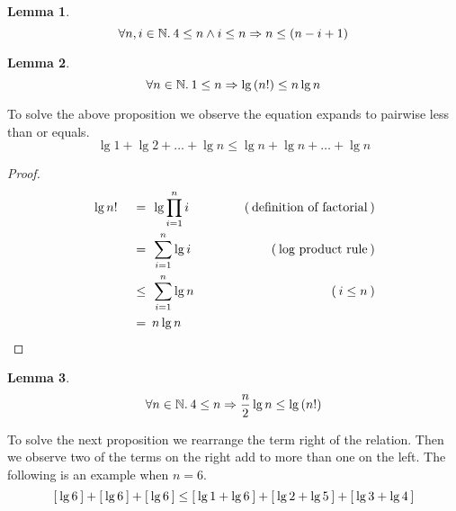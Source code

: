 \documentclass{article}
\newtheorem{lemma}{Lemma}
\theoremstyle{definition}
\newcommand{\evidence}[1]{\ensuremath{\hspace{3em} (\hspace{0.2em} \text{#1} \hspace{0.2em})}}
\newcommand{\relation}[1]{\ensuremath{\hspace{0.2em} {{} #1 {}} \hspace{0.2em}}}
\newcommand{\equal}{\relation{=}}
\newcommand{\lesseq}{\relation{\le}}
\newcommand{\parens}[1]{\left(#1\right)}
\newcommand{\brackets}[1]{\ensuremath{[ \hspace{0.2em} #1 \hspace{0.2em} ]}}
\newcommand{\quantify}[2]{\ensuremath{\forall #1 \in \mathbb{#2}. \hspace{0.2em}}}
\begin{document}
\begin{lemma}
  \begin{equation*}
    \quantify{n, i}{N} 4 \le n \wedge i \le n \Rightarrow n \le (n - i + 1)
  \end{equation*} 
\end{lemma} 

\begin{lemma}
  \begin{equation*}
    \quantify{n}{N} 1 \le n \Rightarrow \lg{\parens{n!}} \le n \lg{n}
  \end{equation*} 
\end{lemma}
\noindent
To solve the above proposition we observe the equation expands to pairwise less than or equals.
\begin{equation*}
  \lg{1} + \lg{2} + \dots + \lg{n} \le \lg{n} + \lg{n} + \dots + \lg{n}
\end{equation*} 
\begin{proof}
      
  \begin{alignat*}{4}
    & \lg{n!} & \equal  & \lg{\prod_{i=1}^{n}{i}}  & \evidence{definition of factorial} \\
    & {}      & \equal  & \sum_{i=1}^{n}{\lg{i}}   & \evidence{log product rule} \\
    & {}      & \lesseq & \sum_{i=1}^{n}{\lg{n}}   & \evidence{$i \le n$} \\  
    & {}      & \equal  & n \lg{n}                & \qedhere
  \end{alignat*}
\end{proof}

\begin{lemma}
  \begin{equation*}
    \quantify{n}{N} 4 \le n \Rightarrow \frac{n}{2} \lg{n} \le \lg{\parens{n!}}
  \end{equation*} 
\end{lemma} 
\noindent
To solve the next proposition we rearrange the term right of the relation.
Then we observe two of the terms on the right add to more than one on the left.
The following is an example when $n = 6$.
\begin{equation*}
  \brackets{\lg{6}} + \brackets{\lg{6}} + \brackets{\lg{6}} \le
  \brackets{\lg{1} + \lg{6}} + \brackets{\lg{2} + \lg{5}} + \brackets{\lg{3} + \lg{4}}
\end{equation*}
\end{document}
